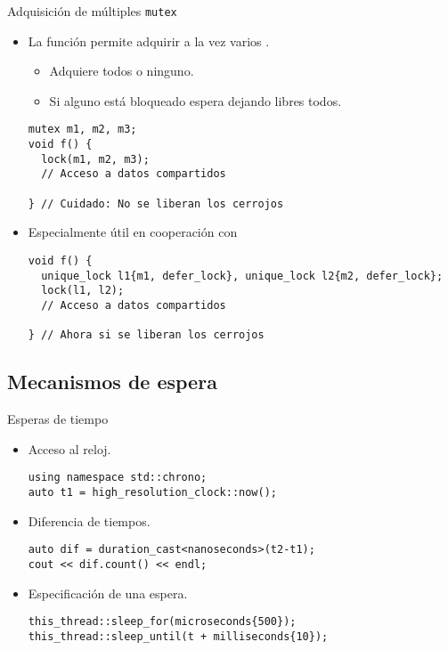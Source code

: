 \begin{frame}[fragile]{Adquisición de múltiples \texttt{mutex}}
\begin{itemize}
  \item La función  permite adquirir a la vez varios .
    \begin{itemize}
      \item Adquiere todos o ninguno.
      \item Si alguno está bloqueado espera dejando libres todos.
    \end{itemize}
\begin{lstlisting}
mutex m1, m2, m3;
void f() {
  lock(m1, m2, m3);
  // Acceso a datos compartidos

} // Cuidado: No se liberan los cerrojos
\end{lstlisting}
  \item Especialmente útil en cooperación con 
\begin{lstlisting}
void f() {
  unique_lock l1{m1, defer_lock}, unique_lock l2{m2, defer_lock};
  lock(l1, l2);
  // Acceso a datos compartidos

} // Ahora si se liberan los cerrojos
\end{lstlisting}
\end{itemize}
\end{frame}

\subsection{Mecanismos de espera}

\begin{frame}[fragile]{Esperas de tiempo}
\begin{itemize}
  \item Acceso al reloj.
\begin{lstlisting}
using namespace std::chrono;
auto t1 = high_resolution_clock::now();
\end{lstlisting}
  \item Diferencia de tiempos.
\begin{lstlisting}
auto dif = duration_cast<nanoseconds>(t2-t1);
cout << dif.count() << endl;
\end{lstlisting}
  \item Especificación de una espera.
\begin{lstlisting}
this_thread::sleep_for(microseconds{500});
this_thread::sleep_until(t + milliseconds{10});
\end{lstlisting}
\end{itemize}
\end{frame}

